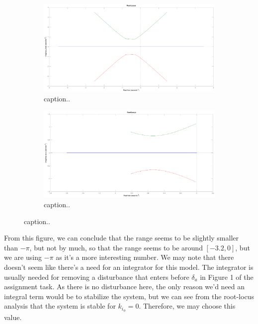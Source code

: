 \subsection{}
\begin{figure}[ht]
	\centering
	\begin{subfigure}[b]{0.45\textwidth}
		\includegraphics[width=\textwidth]{figures/root_locus_k_i_phi}
		\caption{caption..}
		\label{fig:root_locus_large_range}
	\end{subfigure}
	\begin{subfigure}[b]{0.45\textwidth}
		\includegraphics[width=\textwidth]{figures/root_locus_k_i_phi_interval_minus_pi_to_0}
		\caption{caption..}
		\label{fig:root_locus_proper_range}
	\end{subfigure}
\end{figure}

From this figure, we can conclude that the range seems to be slightly smaller than $-\pi$, but not by much, so that the range seems to be around $[-3.2, 0]$, but we are using $-\pi$ as it's a more interesting number. We may note that there doesn't seem like there's a need for an integrator for this model. The integrator is usually needed for removing a disturbance that enters before $\delta_a$ in Figure 1 of the assignment task. As there is no disturbance here, the only reason we'd need an integral term would be to stabilize the system, but we can see from the root-locus analysis that the system is stable for $k_{i_\phi} = 0$. Therefore, we may choose this value. 

